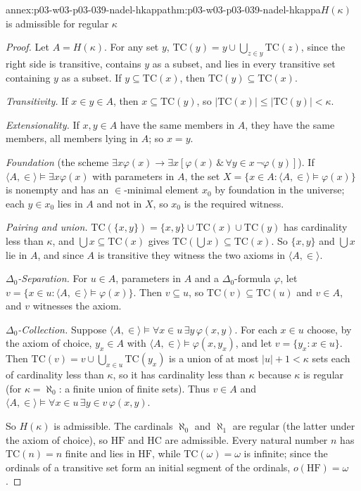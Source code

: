 \begin{annexitem}{annex:p03-w03-p03-039-nadel-hkappa}{thm:p03-w03-p03-039-nadel-hkappa}{\(H(\kappa)\) is admissible for regular \(\kappa\)}
\begin{proof}
Let \(A=H(\kappa)\). For any set \(y\), \(\mathrm{TC}(y)=y\cup\bigcup_{z\in y}\mathrm{TC}(z)\),
since the right side is transitive, contains \(y\) as a subset, and lies in
every transitive set containing \(y\) as a subset. If \(y\subseteq\mathrm{TC}(x)\),
then \(\mathrm{TC}(y)\subseteq\mathrm{TC}(x)\).

\emph{Transitivity.} If \(x\in y\in A\), then \(x\subseteq\mathrm{TC}(y)\), so
\(\lvert\mathrm{TC}(x)\rvert\le\lvert\mathrm{TC}(y)\rvert<\kappa\).

\emph{Extensionality.} If \(x,y\in A\) have the same members in \(A\), they
have the same members, all members lying in \(A\); so \(x=y\).

\emph{Foundation} (the scheme
\(\exists x\varphi(x)\to\exists x[\varphi(x)\,\&\,\forall y\in x\,\neg\varphi(y)]\)).
If \(\langle A,\in\rangle\models\exists x\varphi(x)\) with parameters in
\(A\), the set \(X=\{x\in A:\langle A,\in\rangle\models\varphi(x)\}\) is
nonempty and has an \(\in\)-minimal element \(x_0\) by foundation in the
universe; each \(y\in x_0\) lies in \(A\) and not in \(X\), so \(x_0\) is the
required witness.

\emph{Pairing and union.} \(\mathrm{TC}(\{x,y\})=\{x,y\}\cup\mathrm{TC}(x)\cup\mathrm{TC}(y)\)
has cardinality less than \(\kappa\), and \(\bigcup x\subseteq\mathrm{TC}(x)\)
gives \(\mathrm{TC}(\bigcup x)\subseteq\mathrm{TC}(x)\). So \(\{x,y\}\) and
\(\bigcup x\) lie in \(A\), and since \(A\) is transitive they witness the two
axioms in \(\langle A,\in\rangle\).

\emph{\(\Delta_0\)-Separation.} For \(u\in A\), parameters in \(A\) and a
\(\Delta_0\)-formula \(\varphi\), let
\(v=\{x\in u:\langle A,\in\rangle\models\varphi(x)\}\). Then \(v\subseteq u\),
so \(\mathrm{TC}(v)\subseteq\mathrm{TC}(u)\) and \(v\in A\), and \(v\) witnesses
the axiom.

\emph{\(\Delta_0\)-Collection.} Suppose
\(\langle A,\in\rangle\models\forall x\in u\,\exists y\,\varphi(x,y)\). For each
\(x\in u\) choose, by the axiom of choice, \(y_x\in A\) with
\(\langle A,\in\rangle\models\varphi(x,y_x)\), and let \(v=\{y_x:x\in u\}\).
Then \(\mathrm{TC}(v)=v\cup\bigcup_{x\in u}\mathrm{TC}(y_x)\) is a union of at
most \(\lvert u\rvert+1<\kappa\) sets each of cardinality less than \(\kappa\),
so it has cardinality less than \(\kappa\) because \(\kappa\) is regular (for
\(\kappa=\aleph_0\): a finite union of finite sets). Thus \(v\in A\) and
\(\langle A,\in\rangle\models\forall x\in u\,\exists y\in v\,\varphi(x,y)\).

So \(H(\kappa)\) is admissible. The cardinals \(\aleph_0\) and \(\aleph_1\) are
regular (the latter under the axiom of choice), so \(\mathrm{HF}\) and
\(\mathrm{HC}\) are admissible. Every natural number \(n\) has
\(\mathrm{TC}(n)=n\) finite and lies in \(\mathrm{HF}\), while
\(\mathrm{TC}(\omega)=\omega\) is infinite; since the ordinals of a
transitive set form an initial segment of the ordinals,
\(o(\mathrm{HF})=\omega\).
\end{proof}
\end{annexitem}
